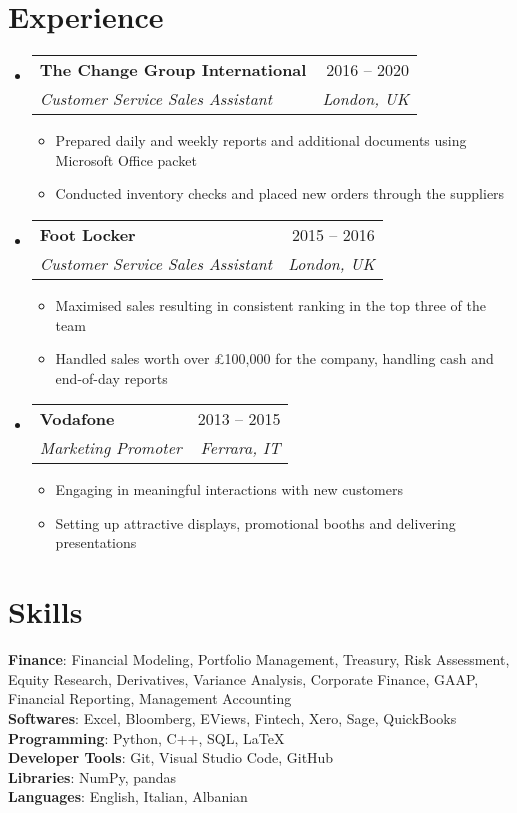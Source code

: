 \documentclass[letterpaper,11pt]{article}
\makeatletter
\newcommand{\resumeItem}[1]{
  \item\small{
    {#1 \vspace{-2pt}}
  }
}
\newcommand{\resumeSubheading}[4]{
  \vspace{-2pt}\item
    \begin{tabular*}{0.97\textwidth}[t]{l@{\extracolsep{\fill}}r}
      \textbf{#1} & #2 \\
      \textit{\small#3} & \textit{\small #4} \\
    \end{tabular*}\vspace{-7pt}
}
\newcommand{\resumeSubHeadingListStart}{\begin{itemize}[leftmargin=0.15in, label={}]}
\newcommand{\resumeSubHeadingListEnd}{\end{itemize}}
\newcommand{\resumeItemListStart}{\begin{itemize}}
\newcommand{\resumeItemListEnd}{\end{itemize}\vspace{-5pt}}
\makeatother
\begin{document}
\section{Experience}
  \resumeSubHeadingListStart

    \resumeSubheading
      {The Change Group International}{2016 -- 2020}
      {Customer Service Sales Assistant}{London, UK}
      \resumeItemListStart
        \resumeItem{Prepared daily and weekly reports and additional documents using Microsoft Office packet}
        \resumeItem{Conducted inventory checks and placed new orders through the suppliers}
      \resumeItemListEnd

    \resumeSubheading
      {Foot Locker}{2015 -- 2016}
      {Customer Service Sales Assistant}{London, UK}
      \resumeItemListStart
        \resumeItem{Maximised sales resulting in consistent ranking in the top three of the team}
        \resumeItem{Handled sales worth over £100,000 for the company, handling cash and end-of-day reports}
    \resumeItemListEnd

    \resumeSubheading
      {Vodafone}{2013 -- 2015}
      {Marketing Promoter}{Ferrara, IT}
      \resumeItemListStart
        \resumeItem{Engaging in meaningful interactions with new customers}
        \resumeItem{Setting up attractive displays, promotional booths and delivering presentations}
      \resumeItemListEnd

   \resumeSubHeadingListEnd

\section{Skills}
 \begin{itemize}[leftmargin=0.15in, label={}]
    \small{\item{
     \textbf{Finance}{: Financial Modeling, Portfolio Management, Treasury, Risk Assessment, Equity Research, Derivatives, Variance Analysis, Corporate Finance, GAAP, Financial Reporting, Management Accounting} \\
     \textbf{Softwares}{: Excel, Bloomberg, EViews, Fintech, Xero, Sage, QuickBooks} \\
     \textbf{Programming}{: Python, C++, SQL, \LaTeX} \\
     \textbf{Developer Tools}{: Git, Visual Studio Code, GitHub} \\
     \textbf{Libraries}{: NumPy, pandas} \\
     \textbf{Languages}{: English, Italian, Albanian}
    }}
 \end{itemize}
\end{document}
